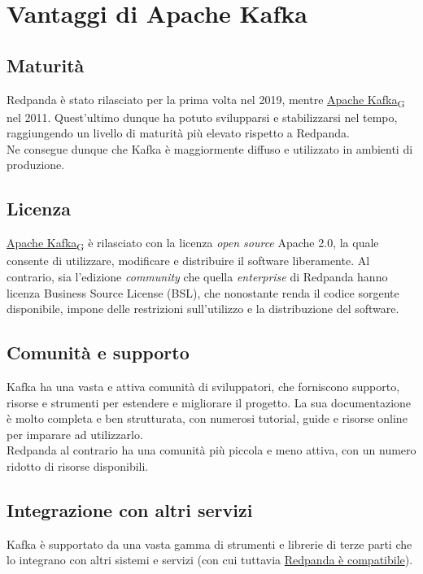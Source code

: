 \section{Vantaggi di Apache Kafka}
\subsection{Maturità}
Redpanda è stato rilasciato per la prima volta nel 2019, mentre \href{https://7last.github.io/docs/rtb/documentazione-interna/glossario\#apache-kafka}{Apache Kafka\textsubscript{G}} nel 2011.
Quest'ultimo dunque ha potuto svilupparsi e stabilizzarsi nel tempo, raggiungendo
un livello di maturità più elevato rispetto a Redpanda.\\
Ne consegue dunque che Kafka è maggiormente diffuso e utilizzato in ambienti di
produzione.

\subsection{Licenza}
\href{https://7last.github.io/docs/rtb/documentazione-interna/glossario\#apache-kafka}{Apache Kafka\textsubscript{G}} è rilasciato con la licenza \textit{open source} Apache 2.0, la quale consente di utilizzare, modificare e distribuire il software liberamente.
Al contrario, sia l'edizione \textit{community} che quella \textit{enterprise} di Redpanda hanno licenza Business Source License (BSL), che
nonostante renda il codice sorgente disponibile, impone delle restrizioni sull'utilizzo e la distribuzione del software.


\subsection{Comunità e supporto}
Kafka ha una vasta e attiva comunità di sviluppatori, che forniscono supporto, risorse e strumenti per estendere e migliorare il progetto.
La sua documentazione è molto completa e ben strutturata, con numerosi tutorial, guide e risorse online per imparare ad utilizzarlo.\\
Redpanda al contrario ha una comunità più piccola e meno attiva, con un numero ridotto di risorse disponibili.

\subsection{Integrazione con altri servizi}
Kafka è supportato da una vasta gamma di strumenti e librerie di terze parti che lo integrano con altri sistemi e servizi
(con cui tuttavia \href{https://docs.redpanda.com/current/develop/kafka-clients/}{Redpanda è compatibile}).

